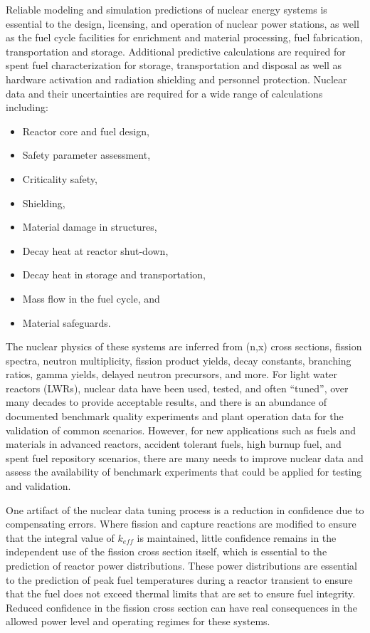 \documentclass[letterpaper,draft]{ar-1col}
\begin{document}
Reliable modeling and simulation predictions of nuclear energy systems is essential to the design, licensing, and operation of nuclear power stations, as well as the fuel cycle facilities for enrichment and material processing, fuel fabrication, transportation and storage. Additional predictive calculations are required for spent fuel characterization for storage, transportation and disposal as well as hardware activation and radiation shielding and personnel protection. Nuclear data and their uncertainties are required for a wide range of calculations including:
\begin{itemize}
  \item Reactor core and fuel design,
  \item Safety parameter assessment,
  \item Criticality safety,
  \item Shielding,
  \item Material damage in structures,
  \item Decay heat at reactor shut-down,
  \item Decay heat in storage and transportation,
  \item Mass flow in the fuel cycle, and
  \item Material safeguards.
\end{itemize}

The nuclear physics of these systems are inferred from (n,x) cross sections, fission spectra, neutron multiplicity, fission product yields, decay constants, branching ratios, gamma yields, delayed neutron precursors, and more.  For light water reactors (LWRs), nuclear data have been used, tested, and often \enquote{tuned}, over many decades to provide acceptable results, and there is an abundance of documented benchmark quality experiments and plant operation data for the validation of common scenarios. However, for new applications such as fuels and materials in advanced reactors, accident tolerant fuels, high burnup fuel, and spent fuel repository scenarios, there are many needs to improve nuclear data and assess the availability of benchmark experiments that could be applied for testing and validation. 

One artifact of the nuclear data tuning process is a reduction in confidence due to compensating errors. Where fission and capture reactions are modified to ensure that the integral value of $k_{eff}$ is maintained, little confidence remains in the independent use of the fission cross section itself, which is essential to the prediction of reactor power distributions. These power distributions are essential to the prediction of peak fuel temperatures during a reactor transient to ensure that the fuel does not exceed thermal limits that are set to ensure fuel integrity. Reduced confidence in the fission cross section can have real consequences in the allowed power level and operating regimes for these systems.
\end{document}
